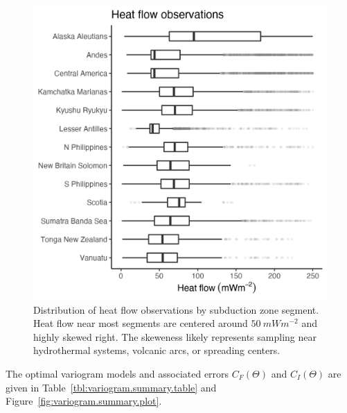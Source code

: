 \documentclass[draft,linenumbers]{agujournal2018}
\begin{document}
\begin{figure}[h]

{\centering \includegraphics[width=0.8\linewidth,]{../figs/summary/hf_summary} 

}

\caption{Distribution of heat flow observations by subduction zone segment. Heat flow near most segments are centered around $50~mWm^{-2}$ and highly skewed right. The skeweness likely represents sampling near hydrothermal systems, volcanic arcs, or spreading centers.}\label{fig:hf.summary.plot}
\end{figure}

The optimal variogram models and associated errors \(C_F(\Theta)\) and
\(C_I(\Theta)\) are given in Table~\ref{tbl:variogram.summary.table} and
Figure~\ref{fig:variogram.summary.plot}.
\end{document}

